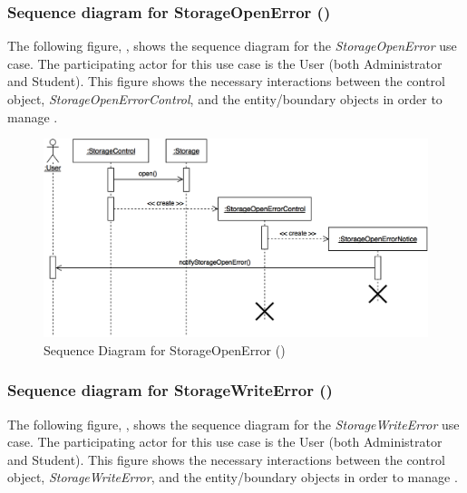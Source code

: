 \documentclass[12pt,letterpaper]{article}
\begin{document}
\subsubsection*{Sequence diagram for StorageOpenError ()}

The following figure, , shows the sequence diagram for the {\it StorageOpenError} use case. The participating actor for this use case is
the User (both Administrator and Student). This figure shows the necessary interactions between the control object, {\it StorageOpenErrorControl}, and the
entity/boundary objects in order to manage .

\begin{figure}[H]
	\centering{}
	\includegraphics[scale=0.27]{imgs/seq/storage-open-error.png}
	\caption[ - Sequence Diagram for StorageOpenError]{Sequence Diagram for StorageOpenError ()}
\end{figure}

\newpage{}

\subsubsection*{Sequence diagram for StorageWriteError ()}

The following figure, , shows the sequence diagram for the {\it StorageWriteError} use case. The participating actor for this use case is
the User (both Administrator and Student). This figure shows the necessary interactions between the control object, {\it StorageWriteError}, and the
entity/boundary objects in order to manage .
\end{document}
